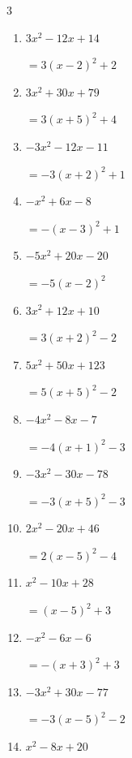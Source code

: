 \begin{multicols}{3}
\begin{enumerate}
\columnbreak %

  \item $3x^{2}-12x+14$

        $=3\left( x-2\right)^{2}+2$

  \item $3x^{2}+30x+79$

        $=3\left( x+5\right)^{2}+4$

  \item $-3x^{2}-12x-11$

        $=-3\left( x+2\right)^{2}+1$

  \item $-x^{2}+6x-8$

        $=-\left( x-3\right)^{2}+1$

  \item $-5x^{2}+20x-20$

        $=-5\left( x-2\right)^{2}$

  \item $3x^{2}+12x+10$

        $=3\left( x+2\right)^{2}-2$

  \item $5x^{2}+50x+123$

        $=5\left( x+5\right)^{2}-2$

  \item $-4x^{2}-8x-7$

        $=-4\left( x+1\right)^{2}-3$

  \item $-3x^{2}-30x-78$

        $=-3\left( x+5\right)^{2}-3$

  \item $2x^{2}-20x+46$

        $=2\left( x-5\right)^{2}-4$

\columnbreak %

\resetques

  \item $x^{2}-10x+28$

        $=\left( x-5\right)^{2}+3$

  \item $-x^{2}-6x-6$

        $=-\left( x+3\right)^{2}+3$

  \item $-3x^{2}+30x-77$

        $=-3\left( x-5\right)^{2}-2$

  \item $x^{2}-8x+20$


\end{enumerate}
\end{multicols}
